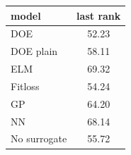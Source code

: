 \begin{tabular}{|lc|}
\hline
model & last rank\\
\hline
DOE & 52.23 \\
DOE plain & 58.11 \\
ELM & 69.32 \\
Fitloss & 54.24 \\
GP & 64.20 \\
NN & 68.14 \\
No surrogate & 55.72 \\
\hline
\end{tabular}
